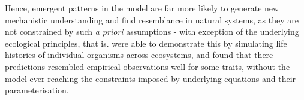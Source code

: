  Hence, emergent patterns in the model are far more likely to generate new mechanistic understanding and find resemblance in natural systems, as they are not constrained by such \textit{a priori} assumptions - with exception of the underlying ecological principles, that is. \citep{Harfoot2014} were able to demonstrate this by simulating life histories of individual organisms across ecosystems, and found that there predictions resembled empirical observations well for some traits, without the model ever reaching the constraints imposed by underlying equations and their parameterisation. \\